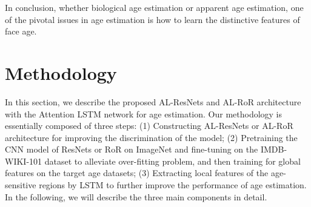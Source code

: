 \documentclass[journal]{IEEEtran}
\begin{document}
\par
In conclusion, whether biological age estimation or apparent age estimation, one of the pivotal issues in age estimation is how to learn the distinctive features of face age.

\section{Methodology}
In this section, we describe the proposed AL-ResNets and AL-RoR architecture with the Attention LSTM network for age estimation. Our methodology is essentially composed of three steps: (1) Constructing AL-ResNets or AL-RoR architecture for improving the discrimination of the model; (2) Pretraining the CNN model of ResNets or RoR on ImageNet and fine-tuning on the IMDB-WIKI-101 dataset to alleviate over-fitting problem, and then training for global features on the target age datasets; (3) Extracting local features of the age-sensitive regions by LSTM to further improve the performance of age estimation. In the following, we will describe the three main components in detail.
\end{document}
